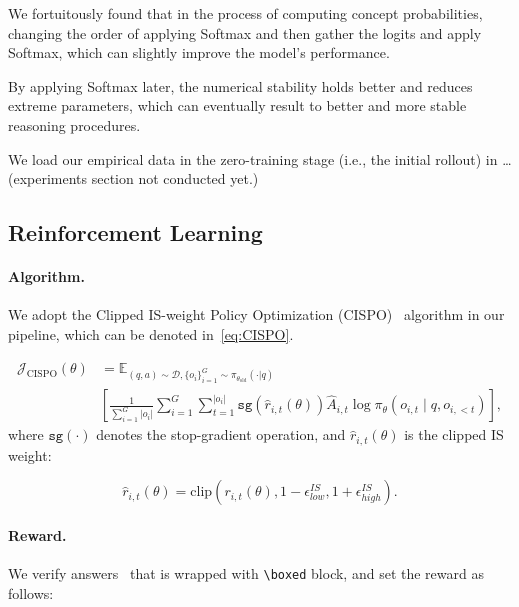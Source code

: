 We fortuitously found that in the process of computing concept probabilities, changing the order of applying Softmax
and then gather the logits and apply Softmax, which can slightly improve the model's performance.

By applying Softmax later, the numerical stability holds better and reduces extreme parameters, which can eventually
result to better and more stable reasoning procedures.

We load our empirical data in the zero-training stage (i.e., the initial rollout) in \ldots (experiments section not
conducted yet.)

\subsection{Reinforcement Learning}\label{subsec:reinforcement-learning}

\paragraph{Algorithm.} We adopt the Clipped IS-weight Policy Optimization (CISPO)~\citep{minimax2025minimaxm1scalingtesttimecompute} algorithm
in our pipeline, which can be denoted in~\ref{eq:CISPO}.

\begin{equation}
    \begin{aligned}
    \mathcal{J}_{\mathrm{CISPO}}(\theta) &= \mathbb{E}_{(q,a) \sim \mathcal{D}, \{o_i\}_{i=1}^G \sim \pi_{\theta_{\text{old}}}(\cdot|q)} \\
    & \left[
        \frac{1}{\sum_{i=1}^G |o_i|} \sum_{i=1}^G \sum_{t=1}^{|o_i|}
        \texttt{sg}(\hat{r}_{i,t}(\theta))\hat{A}_{i,t}\log \pi_\theta(o_{i,t} \mid q, o_{i,<t})
    \right],
    \end{aligned}
    \label{eq:CISPO}
\end{equation}
where $\texttt{sg}(\cdot)$ denotes the stop-gradient operation, and $\hat{r}_{i,t}(\theta)$ is the clipped IS weight:

\begin{equation*}
    \hat{r}_{i,t}(\theta) = \text{clip}\left(r_{
    i,t}(\theta), 1-\epsilon^{IS}_{low}, 1+\epsilon^{IS}_{high}\right).
\end{equation*}

\paragraph{Reward.} We verify answers~\citep{Kydlicek_Math-Verify_Math_Verification} that is wrapped with \texttt{\textbackslash boxed} block, and set the reward as follows:

